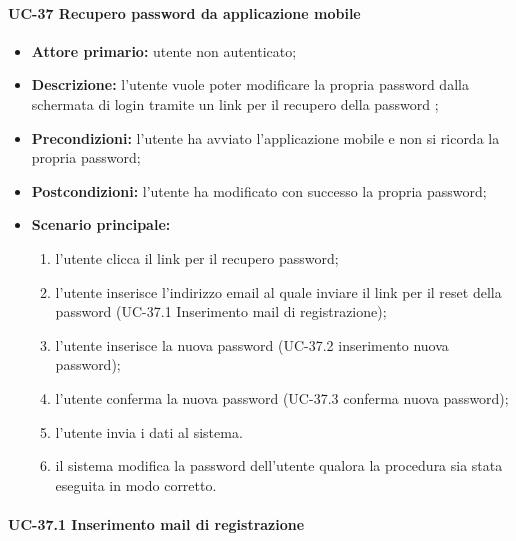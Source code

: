 \paragraph{UC-37 Recupero password da applicazione mobile}

	\begin{itemize}
		\item \textbf{Attore primario:} utente non autenticato;

		\item \textbf{Descrizione:} l'utente vuole poter modificare la propria password dalla schermata di login tramite un link per il recupero della password ;

		\item \textbf{Precondizioni:} l'utente ha avviato l'applicazione mobile e non si ricorda la propria password;

		\item \textbf{Postcondizioni:} l'utente ha modificato con successo la propria password;

		\item \textbf{Scenario principale:}
	  		\begin{enumerate}
		  		\item l'utente clicca il link per il recupero password; 
		  		\item l'utente inserisce l'indirizzo email al quale inviare il link per il reset della password (UC-37.1 Inserimento mail di registrazione);
		  		\item l'utente inserisce la nuova password (UC-37.2 inserimento nuova password);
		  		\item l'utente conferma la nuova password (UC-37.3 conferma nuova password);
		  		\item l'utente invia i dati al sistema.
		  		\item il sistema modifica la password dell'utente qualora la procedura sia stata eseguita in modo corretto.
	  		\end{enumerate}
	\end{itemize}

\paragraph{UC-37.1 Inserimento mail di registrazione}

